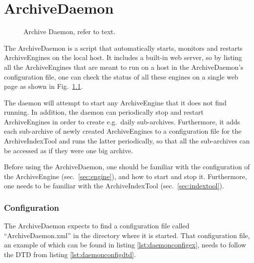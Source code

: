 \chapter{ArchiveDaemon}
\begin{figure}[htb]
\begin{center}
\end{center}
\caption{\label{fig:daemon}Archive Daemon, refer to text.}
\end{figure}

\noindent The ArchiveDaemon is a script that automatically starts,
monitors and restarts ArchiveEngines on the local host. It includes a
built-in web server, so by listing all the ArchiveEngines that are
meant to run on a host in the ArchiveDaemon's configuration file, one
can check the status of all these engines on a single web page as
shown in Fig.~\ref{fig:daemon}.

The daemon will attempt to start any ArchiveEngine that it does not
find running. In addition, the daemon can periodically stop and
restart ArchiveEngines in order to create e.g.\ daily sub-archives.
Furthermore, it adds each sub-archive of newly created ArchiveEngines
to a configuration file for the ArchiveIndexTool and runs the latter
periodically, so that all the sub-archives can be accessed as if they
were one big archive.

Before using the ArchiveDaemon, one should be familiar
with the configuration of the ArchiveEngine (sec.\ \ref{sec:engine}),
and how to start and stop it. Furthermore, one needs to be familiar
with the ArchiveIndexTool (sec.\ \ref{sec:indextool}).

\subsection{Configuration}
The ArchiveDaemon expects to find a configuration file called
``ArchiveDaemon.xml'' in the directory where it is started.  That
configuration file, an example of which can be found in listing
\ref{lst:daemonconfigex}, needs to follow the DTD from listing
\ref{lst:daemonconfigdtd}.





